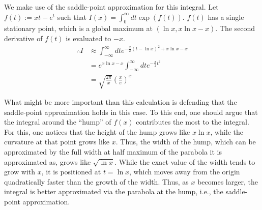 \item

We make use of the saddle-point approximation for this integral.
Let $f(t) := xt - e^t$ such that $I(x) = \int_0^\infty dt \exp(f(t))$.
$f(t)$ has a single stationary point, which is a global maximum at $\left( \ln x, x\ln x - x \right)$.
The second derivative of $f(t)$ is evaluated to $-x$.
\begin{align*}
    \therefore I
    &\approx \int_{-\infty}^\infty dt e^{-\frac{x}{2}{\left(t - \ln x\right)}^2 + x\ln x - x} \\
    &= e^{x\ln x - x} \int_{-\infty}^\infty dt e^{-\frac{x}{2} t^2} \\
    &= \sqrt{\frac{2\pi}{x}} {\left( \frac{x}{e} \right)}^x
\end{align*}

What might be more important than this calculation is defending that the saddle-point approximation holds in this case.
To this end, one should argue that the integral around the ``hump'' of $f(x)$ contributes the most to the integral.
For this, one notices that the height of the hump grows like $x\ln x$, while the curvature at that point grows like $x$.
Thus, the width of the hump, which can be approximated by the full width at half maximum of the parabola it is approximated as, grows like $\sqrt{\ln x}$.
While the exact value of the width tends to grow with $x$, it is positioned at $t = \ln x$, which moves away from the origin quadratically faster than the growth of the width.
Thus, as $x$ becomes larger, the integral is better approximated via the parabola at the hump, i.e., the saddle-point approximation.